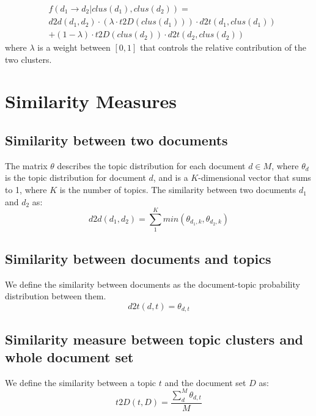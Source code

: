 \begin{align*}
&f(d_1 \rightarrow d_2 | clus(d_1), clus(d_2)) = \\
&d2d(d_1, d_2) \cdot (\lambda \cdot t2D(clus(d_1))) \cdot d2t(d_1, clus(d_1)) \\ 
&+ (1-\lambda) \cdot t2D(clus(d_2)) \cdot d2t(d_2, clus(d_2))
\end{align*}
where $\lambda$ is a weight between $[0,1]$ that controls the relative contribution of the two clusters.


\section{Similarity Measures}\label{sec:similarity}
\subsection{Similarity between two documents}
The matrix $\theta$ describes the topic distribution for each document $d \in M$, where $\theta_d$ is the topic distribution for document $d$, and is a $K$-dimensional vector that sums to 1, where $K$ is the number of topics.
The similarity between two documents $d_1$ and $d_2$ as:
$$ d2d(d_1, d_2) = \sum_{1}^{K} min(\theta_{d_1,k}, \theta_{d_2,k})$$

\subsection{Similarity between documents and topics}
We define the similarity between documents as the document-topic probability distribution between them.
$$ d2t(d,t) = \theta_{d,t}$$

\subsection{Similarity measure between topic clusters and whole document set}
We define the similarity between a topic $t$ and the document set $D$ as:
$$ t2D(t, D) = \frac{\sum_{d}^{M} \theta_{d,t}}{M} $$